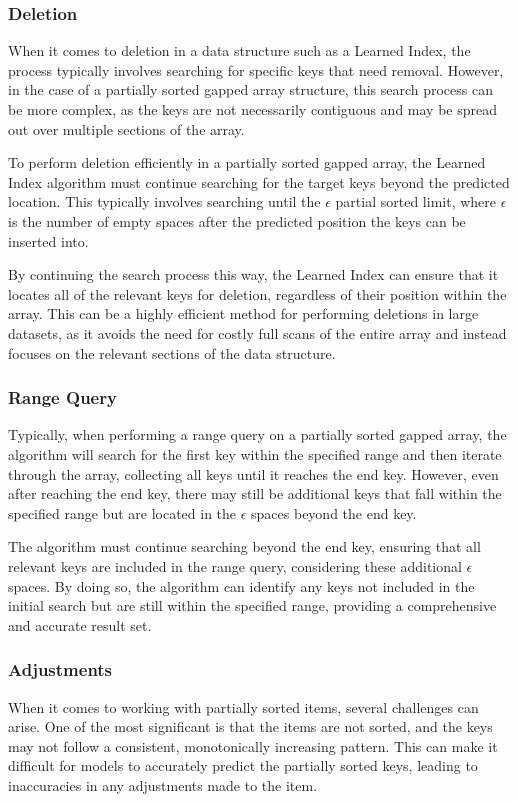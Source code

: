 \documentclass[11pt,a4paper]{article}
\newcommand{\learnindex}{\textsf{Learned Index}\xspace}
\begin{document}
\subsubsection{Deletion}
When it comes to deletion in a data structure such as a \learnindex, the process typically involves searching for specific keys that need removal. However, in the case of a partially sorted gapped array structure, this search process can be more complex, as the keys are not necessarily contiguous and may be spread out over multiple sections of the array.

To perform deletion efficiently in a partially sorted gapped array, the \learnindex algorithm must continue searching for the target keys beyond the predicted location. This typically involves searching until the $\epsilon$ partial sorted limit, where $\epsilon$ is the number of empty spaces after the predicted position the keys can be inserted into.

By continuing the search process this way, the \learnindex can ensure that it locates all of the relevant keys for deletion, regardless of their position within the array. This can be a highly efficient method for performing deletions in large datasets, as it avoids the need for costly full scans of the entire array and instead focuses on the relevant sections of the data structure.
\subsubsection{Range Query}
Typically, when performing a range query on a partially sorted gapped array, the algorithm will search for the first key within the specified range and then iterate through the array, collecting all keys until it reaches the end key. However, even after reaching the end key, there may still be additional keys that fall within the specified range but are located in the $\epsilon$ spaces beyond the end key.

The algorithm must continue searching beyond the end key, ensuring that all relevant keys are included in the range query, considering these additional $\epsilon$ spaces. By doing so, the algorithm can identify any keys not included in the initial search but are still within the specified range, providing a comprehensive and accurate result set.


\subsubsection{Adjustments}
When it comes to working with partially sorted items, several challenges can arise. One of the most significant is that the items are not sorted, and the keys may not follow a consistent, monotonically increasing pattern. This can make it difficult for models to accurately predict the partially sorted keys, leading to inaccuracies in any adjustments made to the item.
\end{document}
